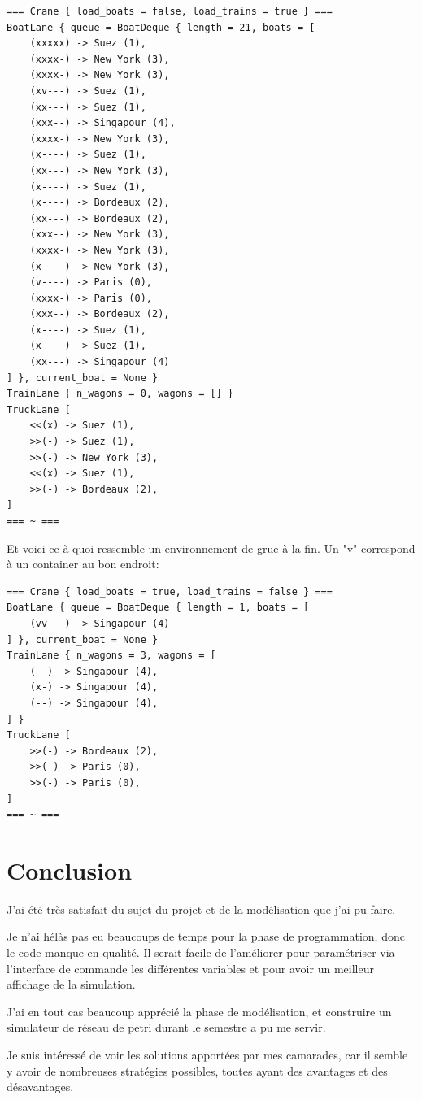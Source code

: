\documentclass[12pt]{article}
\begin{document}
\begin{lstlisting}
=== Crane { load_boats = false, load_trains = true } ===
BoatLane { queue = BoatDeque { length = 21, boats = [
    (xxxxx) -> Suez (1),
    (xxxx-) -> New York (3),
    (xxxx-) -> New York (3),
    (xv---) -> Suez (1),
    (xx---) -> Suez (1),
    (xxx--) -> Singapour (4),
    (xxxx-) -> New York (3),
    (x----) -> Suez (1),
    (xx---) -> New York (3),
    (x----) -> Suez (1),
    (x----) -> Bordeaux (2),
    (xx---) -> Bordeaux (2),
    (xxx--) -> New York (3),
    (xxxx-) -> New York (3),
    (x----) -> New York (3),
    (v----) -> Paris (0),
    (xxxx-) -> Paris (0),
    (xxx--) -> Bordeaux (2),
    (x----) -> Suez (1),
    (x----) -> Suez (1),
    (xx---) -> Singapour (4)
] }, current_boat = None }
TrainLane { n_wagons = 0, wagons = [] }
TruckLane [
    <<(x) -> Suez (1),
    >>(-) -> Suez (1),
    >>(-) -> New York (3),
    <<(x) -> Suez (1),
    >>(-) -> Bordeaux (2),
]
=== ~ ===
\end{lstlisting}

Et voici ce à quoi ressemble un environnement de grue à la fin. Un "v" correspond à un container au bon endroit:

\begin{lstlisting}
=== Crane { load_boats = true, load_trains = false } ===
BoatLane { queue = BoatDeque { length = 1, boats = [
    (vv---) -> Singapour (4)
] }, current_boat = None }
TrainLane { n_wagons = 3, wagons = [
    (--) -> Singapour (4),
    (x-) -> Singapour (4),
    (--) -> Singapour (4),
] }
TruckLane [
    >>(-) -> Bordeaux (2),
    >>(-) -> Paris (0),
    >>(-) -> Paris (0),
]
=== ~ ===
\end{lstlisting}

\section{Conclusion}

J'ai été très satisfait du sujet du projet et de la modélisation que j'ai pu faire.

Je n'ai hélàs pas eu beaucoups de temps pour la phase de programmation, donc le code manque en qualité.
Il serait facile de l'améliorer pour paramétriser via l'interface de commande les différentes variables et pour avoir un meilleur affichage de la simulation.

J'ai en tout cas beaucoup apprécié la phase de modélisation, et construire un simulateur de réseau de petri durant le semestre a pu me servir.

Je suis intéressé de voir les solutions apportées par mes camarades, car il semble y avoir de nombreuses stratégies possibles, toutes ayant des avantages et des désavantages.
\end{document}
